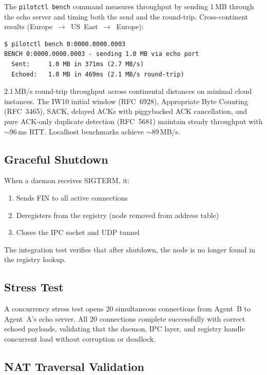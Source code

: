 \documentclass[11pt,a4paper]{article}
\begin{document}
The \texttt{pilotctl bench} command measures throughput by sending 1\,MB through the echo server and timing both the send and the round-trip. Cross-continent results (Europe~$\rightarrow$~US~East~$\rightarrow$~Europe):

\begin{lstlisting}[basicstyle=\ttfamily\small]
$ pilotctl bench 0:0000.0000.0003
BENCH 0:0000.0000.0003 - sending 1.0 MB via echo port
  Sent:     1.0 MB in 371ms (2.7 MB/s)
  Echoed:   1.0 MB in 469ms (2.1 MB/s round-trip)
\end{lstlisting}

2.1\,MB/s round-trip throughput across continental distances on minimal cloud instances. The IW10 initial window (RFC~6928), Appropriate Byte Counting (RFC~3465), SACK, delayed ACKs with piggybacked ACK cancellation, and pure ACK-only duplicate detection (RFC~5681) maintain steady throughput with ${\sim}$96\,ms RTT. Localhost benchmarks achieve ${\sim}$89\,MB/s.

\subsection{Graceful Shutdown}

When a daemon receives SIGTERM, it:
\begin{enumerate}
    \item Sends FIN to all active connections
    \item Deregisters from the registry (node removed from address table)
    \item Closes the IPC socket and UDP tunnel
\end{enumerate}

The integration test verifies that after shutdown, the node is no longer found in the registry lookup.

\subsection{Stress Test}

A concurrency stress test opens 20 simultaneous connections from Agent~B to Agent~A's echo server. All 20 connections complete successfully with correct echoed payloads, validating that the daemon, IPC layer, and registry handle concurrent load without corruption or deadlock.

\subsection{NAT Traversal Validation}
\end{document}
